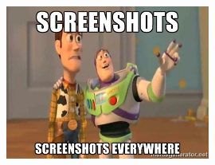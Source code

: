 \documentclass{beamer}
\begin{document}
	\begin{frame}
		\frametitle{\insertsection}
		\begin{figure}
			\centering
			\includegraphics[width=0.6\textwidth]{images/marine.jpg}
		\end{figure}
	\end{frame}

	\begin{frame}
		\frametitle{\insertsection}
	\end{frame}
\end{document}

